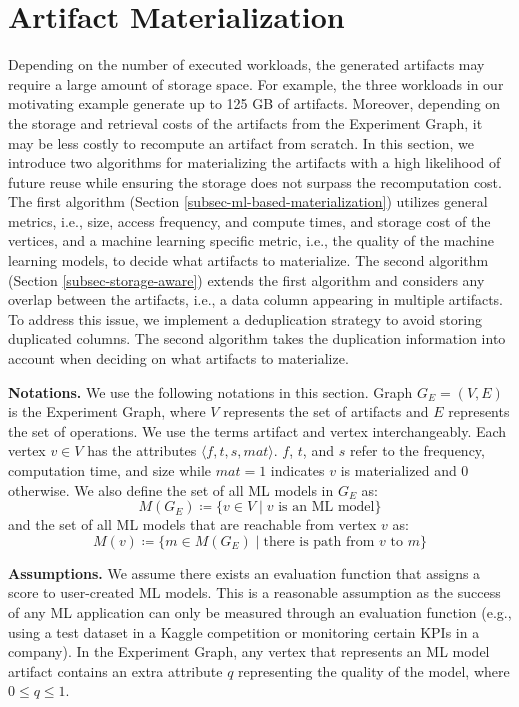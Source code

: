 \section{Artifact Materialization}\label{sec-materialization}
Depending on the number of executed workloads, the generated artifacts may require a large amount of storage space.
For example, the three workloads in our motivating example generate up to 125 GB of artifacts.
Moreover, depending on the storage and retrieval costs of the artifacts from the Experiment Graph, it may be less costly to recompute an artifact from scratch.
In this section, we introduce two algorithms for materializing the artifacts with a high likelihood of future reuse while ensuring the storage does not surpass the recomputation cost.
The first algorithm (Section \ref{subsec-ml-based-materialization}) utilizes general metrics, i.e., size, access frequency, and compute times, and storage cost of the vertices, and a machine learning specific metric, i.e., the quality of the machine learning models, to decide what artifacts to materialize.
The second algorithm (Section \ref{subsec-storage-aware}) extends the first algorithm and considers any overlap between the artifacts, i.e., a data column appearing in multiple artifacts.
To address this issue, we implement a deduplication strategy to avoid storing duplicated columns.
The second algorithm takes the duplication information into account when deciding on what artifacts to materialize.

\textbf{Notations. }
We use the following notations in this section.
Graph $G_E = (V,E)$ is the Experiment Graph, where $V$ represents the set of artifacts and $E$ represents the set of operations.
We use the terms artifact and vertex interchangeably.
Each vertex $v \in V$ has the attributes $\langle f, t, s, mat \rangle$.
$f$, $t$, and $s$ refer to the frequency, computation time, and size while $mat=1$ indicates $v$ is materialized and $0$ otherwise.
We also define the set of all ML models in $G_E$ as:
\[
M(G_E) \coloneqq  \{v \in V \mid v \text{ is an ML model}\}
\] 
and the set of all ML models that are reachable from vertex $v$ as:
\[
M(v) \coloneqq  \{m \in M(G_E) \mid\text{there is path from } v \text{ to } m\}
\] 

\textbf{Assumptions. }
We assume there exists an evaluation function that assigns a score to user-created ML models.
This is a reasonable assumption as the success of any ML application can only be measured through an evaluation function (e.g., using a test dataset in a Kaggle competition or monitoring certain KPIs in a company).
In the Experiment Graph, any vertex that represents an ML model artifact contains an extra attribute $q$ representing the quality of the model, where $0 \leq q \leq 1$.
